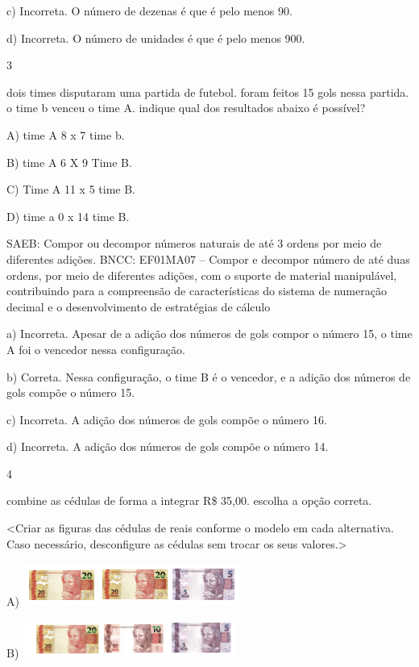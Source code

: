 \begin{itemize}
\begin{itemize}
c) Incorreta. O número de dezenas é que é pelo menos 90.

d) Incorreta. O número de unidades é que é pelo menos 900.

\num{3}

dois times disputaram uma partida de futebol. foram feitos 15 gols nessa
partida. o time b venceu o time A. indique qual dos resultados abaixo é
possível?

A) time A 8 x 7 time b.

B) time A 6 X 9 Time B.

C) Time A 11 x 5 time B.

D) time a 0 x 14 time B.

SAEB: Compor ou decompor números naturais de até 3 ordens por
meio de diferentes adições.
BNCC: EF01MA07 -- Compor e decompor número de até duas ordens, por meio
de diferentes adições, com o suporte de material manipulável,
contribuindo para a compreensão de características do sistema de
numeração decimal e o desenvolvimento de estratégias de cálculo

a) Incorreta. Apesar de a adição dos números de gols compor o número 15, o time A foi o vencedor nessa configuração.

b) Correta. Nessa configuração, o time B é o vencedor, e a adição dos números de gols compõe o número 15.

c) Incorreta. A adição dos números de gols compõe o número 16.

d) Incorreta. A adição dos números de gols compõe o número 14.

\num{4}

combine as cédulas de forma a integrar R\$ 35,00. escolha a opção
correta.

\textless{}Criar as figuras das cédulas de reais conforme o modelo em
cada alternativa. Caso necessário, desconfigure as cédulas sem trocar os
seus valores.\textgreater{}

A)
\includegraphics[width=2.81289in,height=0.55216in]{media/image140.png}

B)
\includegraphics[width=2.78164in,height=0.46882in]{media/image142.png}


\end{itemize}
\end{itemize}
